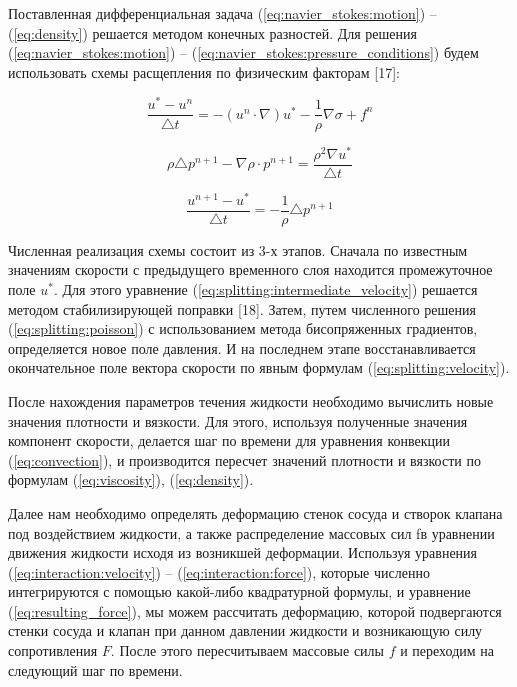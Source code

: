 Поставленная дифференциальная задача (\ref{eq:navier_stokes:motion}) --
(\ref{eq:density}) решается методом конечных разностей. Для решения
(\ref{eq:navier_stokes:motion}) --
(\ref{eq:navier_stokes:pressure_conditions}) будем использовать схемы
расщепления по физическим факторам {[}17{]}:

\begin{equation}\frac{u^* - u^n}{\triangle t} = - (u^n \cdot \nabla) u^* - \frac{1}{\rho}
\nabla \sigma + f^n\label{eq:splitting:intermediate_velocity}\end{equation}

\begin{equation}\rho \triangle p^{n+1} - \nabla \rho \cdot p^{n+1} = \frac{\rho^2 \nabla
u^*}{\triangle t} \label{eq:splitting:poisson}\end{equation}

\begin{equation}\frac{u^{n+1} - u^*}{\triangle t} = - \frac{1}{\rho} \triangle p^{n+1} \label{eq:splitting:velocity}\end{equation}

Численная реализация схемы состоит из 3-х этапов. Сначала по известным
значениям скорости с предыдущего временного слоя находится промежуточное
поле \(u^*\). Для этого уравнение
(\ref{eq:splitting:intermediate_velocity}) решается методом
стабилизирующей поправки {[}18{]}. Затем, путем численного решения
(\ref{eq:splitting:poisson}) с использованием метода бисопряженных
градиентов, определяется новое поле давления. И на последнем этапе
восстанавливается окончательное поле вектора скорости по явным формулам
(\ref{eq:splitting:velocity}).

После нахождения параметров течения жидкости необходимо вычислить новые
значения плотности и вязкости. Для этого, используя полученные значения
компонент скорости, делается шаг по времени для уравнения конвекции
(\ref{eq:convection}), и производится пересчет значений плотности и
вязкости по формулам (\ref{eq:viscosity}), (\ref{eq:density}).

Далее нам необходимо определять деформацию стенок сосуда и створок
клапана под воздействием жидкости, а также распределение массовых сил fв
уравнении движения жидкости исходя из возникшей деформации. Используя
уравнения (\ref{eq:interaction:velocity}) --
(\ref{eq:interaction:force}), которые численно интегрируются с помощью
какой-либо квадратурной формулы, и уравнение (\ref{eq:resulting_force}),
мы можем рассчитать деформацию, которой подвергаются стенки сосуда и
клапан при данном давлении жидкости и возникающую силу сопротивления
\(F\). После этого пересчитываем массовые силы \(f\) и переходим на
следующий шаг по времени.

